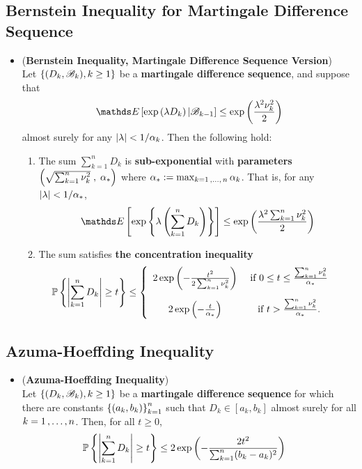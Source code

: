 \documentclass[11pt]{article}
\begin{document}
\subsection{Bernstein Inequality for Martingale Difference Sequence}
\begin{itemize}
\item \begin{proposition} (\textbf{Bernstein Inequality, Martingale Difference Sequence Version}) \citep{wainwright2019high}\\
Let $\left\{(D_k, {\mathscr B}_k), k \ge 1\right\}$ be a \textbf{martingale difference sequence}, and suppose that 
\begin{align*}
\E{}{\exp\paren{\lambda D_k} | \srB_{k-1}} \le \exp\paren{\frac{\lambda^2 \nu_k^2}{2} }
\end{align*} almost surely for any $\left\lvert \lambda \right\rvert < 1/\alpha_k$. Then the following hold:
\begin{enumerate}
\item The sum $\sum_{k=1}^{n}D_k$ is \textbf{sub-exponential} with \textbf{parameters} $\left(\sqrt{\sum_{k=1}^{n}\nu_k^2}\;  , \;\alpha_{*}\right)$ where $\alpha_{*} := \max_{k=1 \,{,}\ldots{,}\, n} \alpha_k$. That is, for any $\left\lvert \lambda \right\rvert < 1/\alpha_{*}$, 
\begin{align*}
\E{}{\exp\set{\lambda \paren{\sum_{k=1}^{n}D_k}}} \le \exp\paren{\frac{\lambda^2\sum_{k=1}^{n}\nu_k^2}{2} }
\end{align*}
\item The sum satisfies \textbf{the concentration inequality}
\begin{align}
{\mathbb P}\left\{\left\lvert \sum_{k=1}^{n}D_k \right\rvert \ge t \right\} &\le \left\{ \begin{array}{cc}
2 \exp\left(- \frac{t^2}{2 \sum_{k=1}^{n}\nu_k^2}\right) & \text{ if } 0 \le t \le \frac{\sum_{k=1}^{n}\nu_k^2}{\alpha_{*}} \\[15pt]
2 \exp\left(- \frac{t}{\alpha_{*}}\right) &\text{ if } t > \frac{\sum_{k=1}^{n}\nu_k^2}{\alpha_{*}}.
\end{array}\right. \label{ineqn: bernstein_inequality_martingale}
\end{align}
\end{enumerate}
\end{proposition}
\end{itemize}
\subsection{Azuma-Hoeffding Inequality}
\begin{itemize}
\item \begin{corollary} (\textbf{Azuma-Hoeffding Inequality})\citep{wainwright2019high}\\
Let $\left\{(D_k, {\mathscr B}_k), k \ge 1\right\}$ be a \textbf{martingale difference sequence} for which there are constants $\left\{(a_k, b_k)\right\}^{n}_{k=1}$ such that $D_k \in [a_k, b_k]$ almost surely for all $k = 1 \,{,}\ldots{,}\, n$. Then, for all $t \ge 0$,
\begin{align}
{\mathbb P}\left\{\left\lvert \sum_{k=1}^{n}D_k \right\rvert \ge t \right\} &\le  2 \exp\left(- \frac{2 t^2}{ \sum_{k=1}^{n}(b_k - a_k)^2}\right) \label{ineqn: hoeffding_inequality_martingale}
\end{align}
\end{corollary}
\end{itemize}
\end{document}
